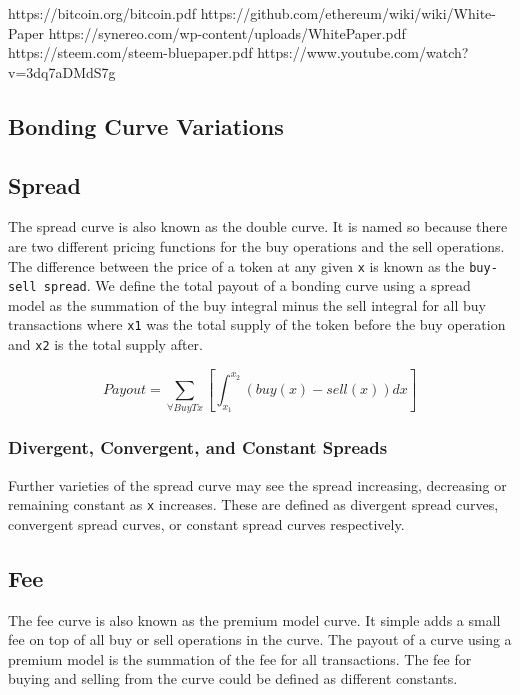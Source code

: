 \documentclass[a4paper, 10pt]{article}
\begin{document}
\begin{thebibliography}{1}

 https://bitcoin.org/bitcoin.pdf
 https://github.com/ethereum/wiki/wiki/White-Paper
 https://synereo.com/wp-content/uploads/WhitePaper.pdf
 https://steem.com/steem-bluepaper.pdf
 https://www.youtube.com/watch?v=3dq7aDMdS7g

\end{thebibliography}

\begin{appendices}

\section{Bonding Curve Variations}

\subsection{Spread}

The spread curve is also known as the double curve. It is named so because there are two different pricing functions for the buy operations and the sell operations. The difference between the price of a token at any given \texttt{x} is known as the \texttt{buy-sell spread}. We define the total payout of a bonding curve using a spread model as the summation of the buy integral minus the sell integral for all buy transactions where \texttt{x1} was the total supply of the token before the buy operation and \texttt{x2} is the total supply after.

\[Payout = \sum_{\forall BuyTx} \left [ \int_{x_{1}}^{x_{2}}(buy(x)-sell(x))dx \right ]\]

\subsubsection{Divergent, Convergent, and Constant Spreads}

Further varieties of the spread curve may see the spread increasing, decreasing or remaining constant as \texttt{x} increases. These are defined as divergent spread curves, convergent spread curves, or constant spread curves respectively.

\subsection{Fee}

The fee curve is also known as the premium model curve. It simple adds a small fee on top of all buy or sell operations in the curve. The payout of a curve using a premium model is the summation of the fee for all transactions. The fee for buying and selling from the curve could be defined as different constants.  


\end{appendices}
\end{document}
